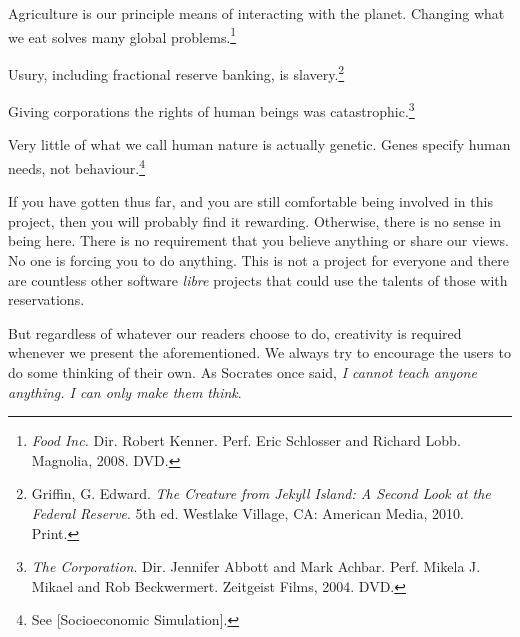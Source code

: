 \item
Agriculture is our principle means of interacting with the planet. Changing what we eat solves many global problems.\footnote{{\it Food Inc.} Dir. Robert Kenner. Perf. Eric Schlosser and Richard Lobb. Magnolia, 2008. DVD.}

\item
Usury, including fractional reserve banking, is slavery.\footnote{Griffin, G. Edward. {\it The Creature from Jekyll Island: A Second Look at the Federal Reserve}. 5th ed. Westlake Village, CA: American Media, 2010. Print.}

\item
Giving corporations the rights of human beings was catastrophic.\footnote{{\it The Corporation}. Dir. Jennifer Abbott and Mark Achbar. Perf. Mikela J. Mikael and Rob Beckwermert. Zeitgeist Films, 2004. DVD.}

\item
Very little of what we call human nature is actually genetic. Genes specify human needs, not behaviour.\footnote{See [Socioeconomic Simulation].}
\stopitemize

If you have gotten thus far, and you are still comfortable being involved in this project, then you will probably find it rewarding. Otherwise, there is no sense in being here. There is no requirement that you believe anything or share our views. No one is forcing you to do anything. This is not a project for everyone and there are countless other software {\it libre} projects that could use the talents of those with reservations.

But regardless of whatever our readers choose to do, creativity is required whenever we present the aforementioned. We always try to encourage the users to do some thinking of their own. As Socrates once said, {\it I cannot teach anyone anything. I can only make them think}.

\StopChapter

